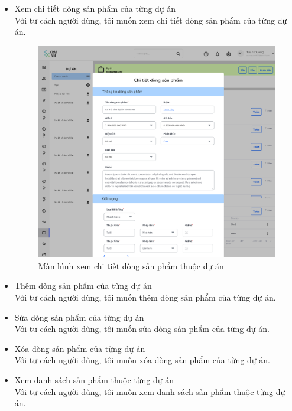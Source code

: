 \documentclass[12pt,a4paper]{article}
\begin{document}
\begin{enumerate}
\begin{itemize}
            \item  Xem chi tiết dòng sản phẩm của từng dự án \\
            Với tư cách người dùng, tôi muốn xem chi tiết dòng sản phẩm của từng dự án.


            \begin{figure}[H]
                \centering \includegraphics[width=\textwidth]{Img/Nguyet/DuAn/chitietdongsp.png}
                \vspace{0.5cm}
                \caption{Màn hình xem chi tiết dòng sản phẩm thuộc dự án }
                \label{ctdspduan}
            \end{figure}

            \item Thêm dòng sản phẩm của từng dự án \\
            Với tư cách người dùng, tôi muốn thêm dòng sản phẩm của từng dự án.

            \item Sửa dòng sản phẩm của từng dự án \\
            Với tư cách người dùng, tôi muốn sửa dòng sản phẩm của từng dự án.

            \item Xóa dòng sản phẩm của từng dự án\\
            Với tư cách người dùng, tôi muốn xóa dòng sản phẩm của từng dự án.

            \item Xem danh sách sản phẩm thuộc từng dự án \\
            Với tư cách người dùng, tôi muốn xem danh sách sản phẩm thuộc từng dự án.



\end{itemize}
\end{enumerate}
\end{document}
